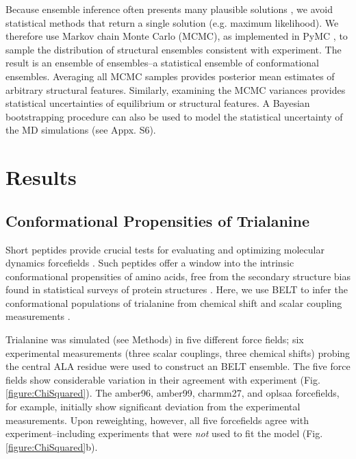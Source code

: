 \documentclass[journal=jacsat,manuscript=article]{achemso}
\begin{document}
Because ensemble inference often presents many plausible solutions \cite{fisher2010, rieping2005}, we avoid statistical methods that return a single solution (e.g. maximum likelihood).  We therefore use Markov chain Monte Carlo (MCMC), as implemented in PyMC \cite{patil2010pymc}, to sample the distribution of structural ensembles consistent with experiment.  The result is an ensemble of ensembles--a statistical ensemble of conformational ensembles.  Averaging all MCMC samples provides posterior mean  estimates of arbitrary structural features.  Similarly, examining the MCMC variances provides statistical uncertainties of equilibrium or structural features.  A Bayesian bootstrapping procedure \cite{rubin1981} can also be used to model the statistical uncertainty of the MD simulations (see Appx. S6).

\section{Results}

\subsection{Conformational Propensities of Trialanine}

Short peptides provide crucial tests for evaluating and optimizing molecular dynamics forcefields \cite{Graf2007,beauchamp2012protein, Nerenberg2011, Best2008, Grdadolnik2011}.  Such peptides offer a window into the intrinsic conformational propensities of amino acids, free from the secondary structure bias found in statistical surveys of protein structures \cite{Jha2005}.  Here, we use BELT to infer the conformational populations of trialanine from chemical shift and scalar coupling measurements \cite{Graf2007}.  

Trialanine was simulated (see Methods) in five different force fields; six experimental measurements (three scalar couplings, three chemical shifts) probing the central ALA residue were used to construct an BELT ensemble.  The five force fields show considerable variation in their agreement with experiment (Fig. \ref{figure:ChiSquared}).  The amber96, amber99, charmm27, and oplsaa forcefields, for example, initially show significant deviation from the experimental measurements.  Upon reweighting, however, all five forcefields agree with experiment--including experiments that were \emph{not} used to fit the model (Fig. \ref{figure:ChiSquared}b).  
\end{document}
